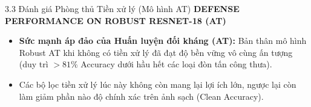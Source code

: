 \documentclass[10pt, xcolor=table]{beamer}
\begin{document}
\begin{frame}{3.3 Đánh giá Phòng thủ Tiền xử lý (Mô hình AT)}
    \centering
    \small \textbf{DEFENSE PERFORMANCE ON ROBUST RESNET-18 (AT)}
    \vspace{0.1cm}
    
    \vspace{0.2cm}
    \begin{itemize}
        \item \textbf{Sức mạnh áp đảo của Huấn luyện đối kháng (AT):} Bản thân mô hình Robust AT khi không có tiền xử lý đã đạt độ bền vững vô cùng ấn tượng (duy trì $>81\%$ Accuracy dưới hầu hết các loại đòn tấn công thưa).
        \item Các bộ lọc tiền xử lý lúc này không còn mang lại lợi ích lớn, ngược lại còn làm giảm phần nào độ chính xác trên ảnh sạch (Clean Accuracy).
    \end{itemize}
\end{frame}
\end{document}
